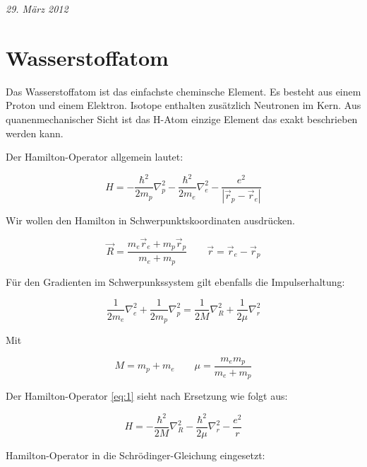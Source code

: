 

\usepackage{amsmath}                %



\textit{29. März 2012}

\section*{Wasserstoffatom}

Das Wasserstoffatom ist das einfachste cheminsche Element. Es besteht aus einem Proton und einem Elektron. Isotope enthalten zusätzlich Neutronen im Kern. Aus quanenmechanischer Sicht ist das H-Atom einzige Element das exakt beschrieben werden kann. 

Der Hamilton-Operator allgemein lautet:

\begin{equation}
  \label{eq:1}
  H = -\frac{\hbar^2}{2m_p}\nabla^2_p - \frac{\hbar^2}{2m_{e}}\nabla^2_e - \frac{e^2}{|\vec r_p-\vec r_e|}
\end{equation}

Wir wollen den Hamilton in Schwerpunktskoordinaten ausdrücken.

\begin{equation}
  \label{eq:2}
  \vec R = \frac{m_e\vec r_e + m_p\vec r_p}{m_e+m_p} \qquad \vec r = \vec r_e-\vec r_p
\end{equation}

Für den Gradienten im Schwerpunkssystem gilt ebenfalls die Impulserhaltung:

\begin{equation}
  \label{eq:3}
  \frac{1}{2m_e}\nabla_e^2 + \frac{1}{2m_p}\nabla_p^2 = \frac{1}{2M}\nabla_R^2 + \frac{1}{2\mu}\nabla_r^2
\end{equation}

Mit

\begin{equation}
  \label{eq:5}
  M = m_p+m_e\qquad \mu = \frac{m_em_p}{m_e+m_p}
\end{equation}

Der Hamilton-Operator \eqref{eq:1} sieht nach Ersetzung wie folgt aus:

\begin{equation}
  \label{eq:4}
  H = -\frac{\hbar^2}{2M}\nabla^2_R - \frac{\hbar^2}{2\mu}\nabla^2_r - \frac{e^2}{r}
\end{equation}

Hamilton-Operator in die Schrödinger-Gleichung eingesetzt:

